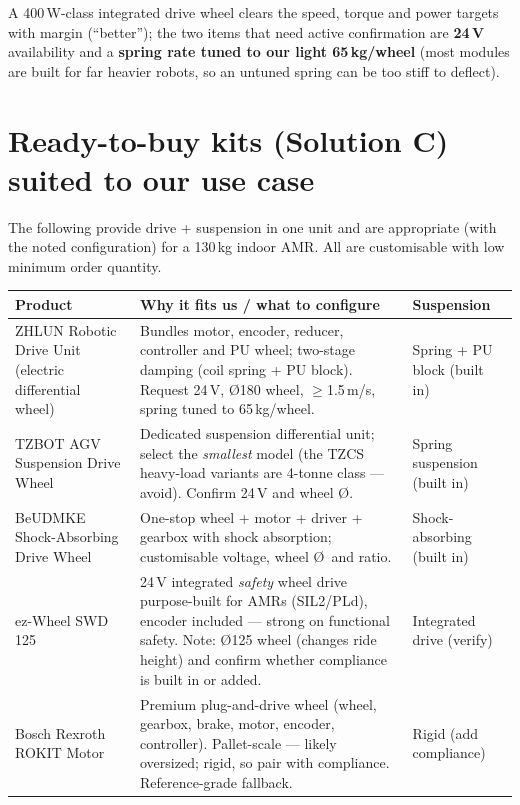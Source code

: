 \documentclass[11pt,a4paper]{article}
\begin{document}
\noindent A 400\,W-class integrated drive wheel clears the speed, torque and power targets with margin
(``better''); the two items that need active confirmation are \textbf{24\,V} availability and a
\textbf{spring rate tuned to our light 65\,kg/wheel} (most modules are built for far heavier robots, so
an untuned spring can be too stiff to deflect).

\section{Ready-to-buy kits (Solution C) suited to our use case}
The following provide drive + suspension in one unit and are appropriate (with the noted configuration)
for a 130\,kg indoor AMR. All are customisable with low minimum order quantity.

\begin{center}\small
\renewcommand{\arraystretch}{1.3}
\begin{tabularx}{\linewidth}{@{}p{3.0cm}Y p{2.6cm}@{}}
\toprule
\textbf{Product} & \textbf{Why it fits us / what to configure} & \textbf{Suspension} \\
\midrule
{}
ZHLUN Robotic Drive Unit (electric differential wheel)~\cite{zhlun} &
Bundles motor, encoder, reducer, controller and PU wheel; two-stage damping (coil spring + PU block).
Request 24\,V, \O180 wheel, $\geq$1.5\,m/s, spring tuned to 65\,kg/wheel. & Spring + PU block (built in) \\
TZBOT AGV Suspension Drive Wheel~\cite{tzbot} &
Dedicated suspension differential unit; select the \emph{smallest} model (the TZCS heavy-load variants
are 4-tonne class --- avoid). Confirm 24\,V and wheel \O. & Spring suspension (built in) \\
BeUDMKE Shock-Absorbing Drive Wheel~\cite{dmk} &
One-stop wheel + motor + driver + gearbox with shock absorption; customisable voltage, wheel \O\ and
ratio. & Shock-absorbing (built in) \\
ez-Wheel SWD\,125~\cite{ezwheel} &
24\,V integrated \emph{safety} wheel drive purpose-built for AMRs (SIL2/PLd), encoder included ---
strong on functional safety. Note: \O125 wheel (changes ride height) and confirm whether compliance is
built in or added. & Integrated drive (verify) \\
Bosch Rexroth ROKIT Motor~\cite{rokit} &
Premium plug-and-drive wheel (wheel, gearbox, brake, motor, encoder, controller). Pallet-scale ---
likely oversized; rigid, so pair with compliance. Reference-grade fallback. & Rigid (add compliance) \\
\bottomrule
\end{tabularx}
\end{center}
\end{document}
